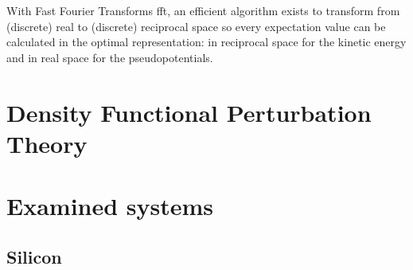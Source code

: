 \documentclass[main.tex]{subfiles}
\begin{document}
With Fast Fourier Transforms \gls{fft}, an efficient algorithm exists to transform from (discrete) real to (discrete) reciprocal space so every expectation value can be calculated in the optimal representation: in reciprocal space for the kinetic energy and in real space for the pseudopotentials.

\section{Density Functional Perturbation Theory}\label{sec:theory_dfpt}


\section{Examined systems}

\subsection{Silicon}

\subsection{\TaS}
\end{document}
